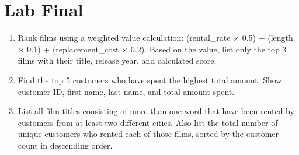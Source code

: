 \documentclass[12pt,a4paper]{article}
\newif\ifshowsolutions
\begin{document}
\section{Lab Final}
\begin{enumerate}

\item Rank films using a weighted value calculation: (rental\_rate × 0.5) + (length × 0.1) + (replacement\_cost × 0.2). Based on the value, list only the top 3 films with their title, release year, and calculated score.
\ifshowsolutions
\begin{lstlisting}[language=SQL]
SELECT 
    title, 
    release_year, 
    (rental_rate * 0.5) + (length * 0.1) + (replacement_cost * 0.2) AS value_score
FROM film
ORDER BY value_score DESC
LIMIT 3;
\end{lstlisting}
\fi

\item Find the top 5 customers who have spent the highest total amount. Show customer ID, first name, last name, and total amount spent.

\ifshowsolutions
\begin{lstlisting}[language=SQL]
SELECT c.customer_id, c.first_name, c.last_name,
       SUM(p.amount) AS total_spent
FROM customer c
JOIN payment p ON p.customer_id = c.customer_id
GROUP BY c.customer_id, c.first_name, c.last_name
ORDER BY total_spent DESC
LIMIT 5;
\end{lstlisting}
\fi

\item List all film titles consisting of more than one word that have been rented by customers from at least two different cities. Also list the total number of unique customers who rented each of those films, sorted by the customer count in descending order.

\ifshowsolutions
\begin{lstlisting}[language=SQL]
SELECT 
    f.title,
    COUNT(DISTINCT c.customer_id) AS customer_count
FROM film f
JOIN inventory i ON f.film_id = i.film_id
JOIN rental r ON i.inventory_id = r.inventory_id
JOIN customer c ON r.customer_id = c.customer_id
JOIN address a ON c.address_id = a.address_id
JOIN city ci ON a.city_id = ci.city_id
WHERE f.title LIKE '% %'
GROUP BY f.film_id, f.title
HAVING COUNT(DISTINCT ci.city_id) >= 2
ORDER BY customer_count DESC;
\end{lstlisting}
\fi



\end{enumerate}
\end{document}
